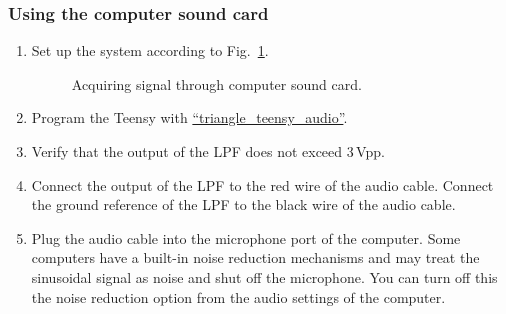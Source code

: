 \documentclass[letterpaper, 11pt]{article}
\begin{document}
\subsubsection{Using the computer sound card}
\label{sec:soundcard}

\begin{enumerate}
	\item Set up the system according to Fig.~\ref{fig:audio-1}.
		\begin{figure}[h]
			\caption{Acquiring signal through computer sound card.}
			\label{fig:audio-1}
		\end{figure}

	\item Program the Teensy with \href{https://github.com/ucdart/UCD-EEC134/blob/master/labs/lab1/code/triangle_teensy_audio/triangle_teensy_audio.ino}{``triangle\_teensy\_audio''}. 
	
	\item Verify that the output of the LPF does not exceed 3\,Vpp. 	

	\item Connect the output of the LPF to the red wire of the audio cable. Connect the ground reference of the LPF to the black wire of the audio cable. 
	
	\item Plug the audio cable into the microphone port of the computer. Some computers have a built-in noise reduction mechanisms and may treat the sinusoidal signal as noise and shut off the microphone. You can turn off this the noise reduction option from the audio settings of the computer.  
	

\end{enumerate}
\end{document}
